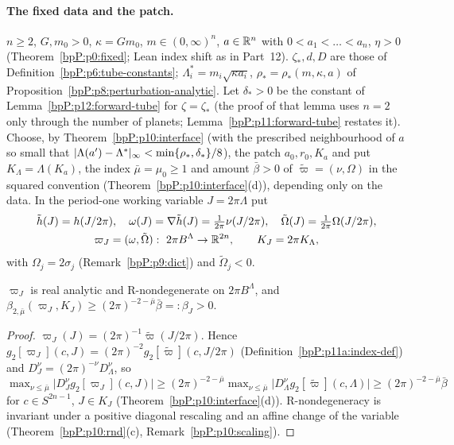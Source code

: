 \paragraph{The fixed data and the patch.} $n\ge2$, $G,m_0>0$, $\kappa=Gm_0$, $m\in(0,\infty)^n$, $a\in\mathbb{R}^n$ with $0<a_1<\dots<a_n$, $\eta>0$ (Theorem~\ref{bpP:p0:fixed}; Lean index shift as in Part~12). $\zeta_*,d,D$ are those of Definition~\ref{bpP:p6:tube-constants}; $\Lambda^*_i=m_i\sqrt{\kappa a_i}$, $\rho_*=\rho_*(m,\kappa,a)$ of Proposition~\ref{bpP:p8:perturbation-analytic}. Let $\delta_*>0$ be the constant of Lemma~\ref{bpP:p12:forward-tube} for $\zeta=\zeta_*$ (the proof of that lemma uses $n=2$ only through the number of planets; Lemma~\ref{bpP:p11:forward-tube} restates it). Choose, by Theorem~\ref{bpP:p10:interface} (with the prescribed neighbourhood of $a$ so small that $\lvert \Lambda(a')-\Lambda^*\rvert_\infty<\min\{\rho_*,\delta_*\}/8$), the patch $a_0,r_0,K_a$ and put $K_\Lambda=\Lambda(K_a)$, the index $\bar\mu=\mu_0\ge1$ and amount $\bar\beta>0$ of $\tilde\varpi=(\nu,\Omega)$ in the squared convention (Theorem~\ref{bpP:p10:interface}(d)), depending only on the data. In the period-one working variable $J=2\pi\Lambda$ put
\[\begin{gathered}\tilde h(J)=h(J/2\pi),\quad\omega(J)=\nabla\tilde h(J)=\tfrac1{2\pi}\nu(J/2\pi),\quad\tilde\Omega(J)=\tfrac1{2\pi}\Omega(J/2\pi),\\ \varpi_J=(\omega,\tilde\Omega):\ 2\pi B^\Lambda\to\mathbb{R}^{2n},\qquad K_J=2\pi K_\Lambda,\end{gathered}\]
with $\Omega_j=2\sigma_j$ (Remark~\ref{bpP:p9:dict}) and $\tilde\Omega_j<0$.

\begin{lemma}\label{bpP:p11:norm-dict}
$\varpi_J$ is real analytic and R-nondegenerate on $2\pi B^\Lambda$, and $\beta_{2,\bar\mu}(\varpi_J,K_J)\ge(2\pi)^{-2-\bar\mu}\bar\beta=:\beta_J>0$.
\end{lemma}
\begin{proof}
\label{stepP:p11:nd} $\varpi_J(J)=(2\pi)^{-1}\tilde\varpi(J/2\pi)$. Hence $g_2[\varpi_J](c,J)=(2\pi)^{-2}g_2[\tilde\varpi](c,J/2\pi)$ (Definition~\ref{bpP:p11a:index-def}) and $D_J^\nu=(2\pi)^{-\nu}D_\Lambda^\nu$, so $\max_{\nu\le\bar\mu}\lvert D^\nu_Jg_2[\varpi_J](c,J)\rvert\ge(2\pi)^{-2-\bar\mu}\max_{\nu\le\bar\mu}\lvert D^\nu_\Lambda g_2[\tilde\varpi](c,\Lambda)\rvert\ge(2\pi)^{-2-\bar\mu}\bar\beta$ for $c\in S^{2n-1}$, $J\in K_J$ (Theorem~\ref{bpP:p10:interface}(d)). R-nondegeneracy is invariant under a positive diagonal rescaling and an affine change of the variable (Theorem~\ref{bpP:p10:rnd}(c), Remark~\ref{bpP:p10:scaling}).
\end{proof}

